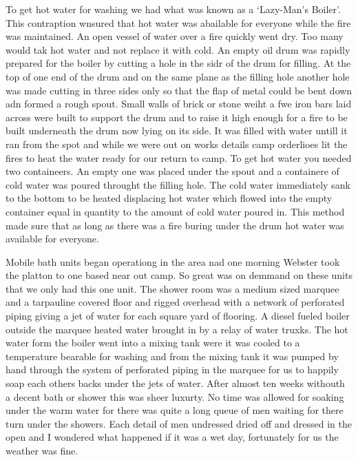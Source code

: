 To get hot water for washing we had what was known as a `Lazy-Man's
Boiler'. This contraption wnsured that hot water was abailable for
everyone while the fire was maintained. An open vessel of water over a
fire quickly went dry. Too many would tak hot water and not replace it
with cold. An empty oil drum was rapidly prepared for the boiler by
cutting a hole in the sidr of the drum for filling. At the top of one
end of the drum and on the same plane as the filling hole another hole
was made cutting in three sides only so that the flap of metal could
be bent down adn formed a rough spout. Small walls of brick or stone
weiht a fwe iron bars laid across were built to support the drum and
to raise it high enough for a fire to be built underneath the drum now
lying on its side. It was filled with water untill it ran from the
spot and while we were out on works details camp orderlioes lit the
fires to heat the water ready for our return to camp. To get hot water
you needed two containeers. An empty one was placed under the spout
and a containere of cold water was poured throught the filling
hole. The cold water immediately sank to the bottom to be heated
displacing hot water which flowed into the empty container equal in
quantity to the amount of cold water poured in. This method made sure
that as long as there was a fire buring under the drum hot water was
available for everyone.

Mobile bath units began operationg in the area nad one morning \lsergeant
Webster took the platton to one based near out camp. So great was on
demmand on these units that we only had this one unit. The shower room
was a medium sized marquee and a tarpauline covered floor and rigged
overhead with a network of perforated piping giving a jet of water for
each square yard of flooring. A diesel fueled boiler outside the
marquee heated water brought in by a relay of water truxks. The hot
water form the boiler went into a mixing tank were it was cooled to a
temperature bearable for washing and from the mixing tank it was
pumped by hand through the system of perforated piping in the marquee
for us to happily soap each others backs under the jets of
water. After almost ten weeks withouth a decent bath or shower this
was sheer luxurty. No time was allowed for soaking under the warm
water for there was quite a long queue of men waiting for there turn
under the showers. Each detail of men undressed dried off and dressed
in the open and I wondered what happened if it was a wet day,
fortunately for us the weather was fine.


